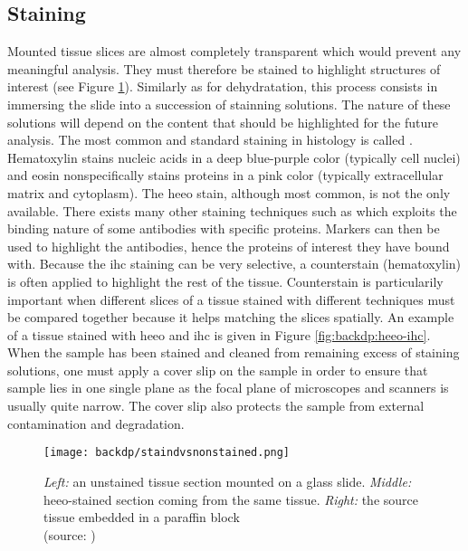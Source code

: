 \subsection{Staining}
\label{ssec:backdp:staining}
Mounted tissue slices are almost completely transparent which would prevent any meaningful analysis. They must therefore be stained to highlight structures of interest (see Figure \ref{fig:backdp:stainedvsnonstained}). Similarly as for dehydratation, this process consists in immersing the slide into a succession of stainning solutions. The nature of these solutions will depend on the content that should be highlighted for the future analysis. The most common and standard staining in histology is called . Hematoxylin stains nucleic acids in a deep blue-purple color (typically cell nuclei) and eosin nonspecifically stains proteins in a pink color (typically extracellular matrix and cytoplasm). The \acrshort{heeo} stain, although most common, is not the only available. There exists many other staining techniques such as  which exploits the binding nature of some antibodies with specific proteins. Markers can then be used to highlight the antibodies, hence the proteins of interest they have bound with. Because the \acrshort{ihc} staining can be very selective, a counterstain (\eg hematoxylin) is often applied to highlight   the rest of the tissue. Counterstain is particularily important when different slices of a tissue stained with different techniques must be compared together because it helps matching the slices spatially. An example of a tissue stained with \acrshort{heeo} and \acrshort{ihc} is given in Figure \ref{fig:backdp:heeo-ihc}. When the sample has been stained and cleaned from remaining excess of staining solutions, one must apply a cover slip on the sample in order to ensure that sample lies in one single plane as the focal plane of microscopes and scanners is usually quite narrow. The cover slip also protects the sample from external contamination and degradation. 

\begin{figure}
  \centering
  \texttt{[image: backdp/staindvsnonstained.png]}
  \caption{\textit{Left:} an unstained tissue section mounted on a glass slide. \textit{Middle:} \acrshort{heeo}-stained section coming from the same tissue. \textit{Right:} the source tissue embedded in a paraffin block \\ (source: \parencite{abbasi2019all})}
  \label{fig:backdp:stainedvsnonstained}
\end{figure}

